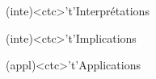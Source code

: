 \documentclass[../../main/main.tex]{subfiles}
\begin{document}
\begin{tcn}[sidebyside, fontupper=\small, fontlower=\small]
	\begin{tcn}(inte)<ctc>'t'{Interprétations}
	\end{tcn}
	\begin{tcn}(inte)<ctc>'t'{Implications}
	\end{tcn}
	\begin{tcn}(appl)<ctc>'t'{Applications}
	\end{tcn}

\end{tcn}
\end{document}
